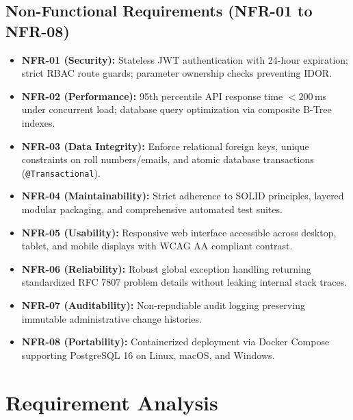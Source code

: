 \documentclass[12pt,a4paper,oneside]{report}
\begin{document}
\section{Non-Functional Requirements (NFR-01 to NFR-08)}
\begin{itemize}
    \item \textbf{NFR-01 (Security):} Stateless JWT authentication with 24-hour expiration; strict RBAC route guards; parameter ownership checks preventing IDOR.
    \item \textbf{NFR-02 (Performance):} 95th percentile API response time $< 200$\,ms under concurrent load; database query optimization via composite B-Tree indexes.
    \item \textbf{NFR-03 (Data Integrity):} Enforce relational foreign keys, unique constraints on roll numbers/emails, and atomic database transactions (\texttt{@Transactional}).
    \item \textbf{NFR-04 (Maintainability):} Strict adherence to SOLID principles, layered modular packaging, and comprehensive automated test suites.
    \item \textbf{NFR-05 (Usability):} Responsive web interface accessible across desktop, tablet, and mobile displays with WCAG AA compliant contrast.
    \item \textbf{NFR-06 (Reliability):} Robust global exception handling returning standardized RFC 7807 problem details without leaking internal stack traces.
    \item \textbf{NFR-07 (Auditability):} Non-repudiable audit logging preserving immutable administrative change histories.
    \item \textbf{NFR-08 (Portability):} Containerized deployment via Docker Compose supporting PostgreSQL 16 on Linux, macOS, and Windows.
\end{itemize}

\chapter{Requirement Analysis}
\end{document}
